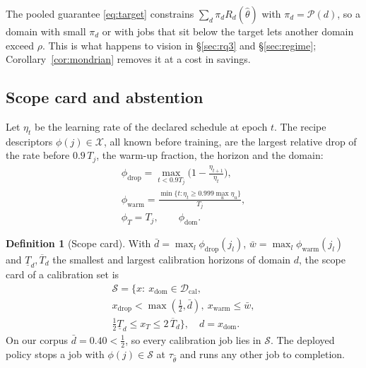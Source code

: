 \documentclass[3p,twocolumn,10pt]{elsarticle}
\theoremstyle{definition}
\newtheorem{definition}{Definition}
\begin{document}
\noindent The pooled guarantee \eqref{eq:target} constrains $\sum_d\pi_dR_d(\hat\theta)$ with $\pi_d=\mathcal{P}(d)$, so a domain with small $\pi_d$ or with jobs that sit below the target lets another domain exceed $\rho$. This is what happens to vision in \S\ref{sec:rq3} and \S\ref{sec:regime}; Corollary~\ref{cor:mondrian} removes it at a cost in savings.

\subsection{Scope card and abstention}
Let $\eta_t$ be the learning rate of the declared schedule at epoch $t$. The recipe descriptors $\phi(j)\in\mathcal{X}$, all known before training, are the largest relative drop of the rate before $0.9\,T_j$, the warm-up fraction, the horizon and the domain:
\begin{equation}
\begin{gathered}
\phi_{\mathrm{drop}}=\max_{t<0.9T_j}\Big(1-\frac{\eta_{t+1}}{\eta_t}\Big),\\
\phi_{\mathrm{warm}}=\frac{\min\{t:\eta_t\ge0.999\max_u\eta_u\}}{T_j},\\
\phi_T=T_j,\qquad \phi_{\mathrm{dom}}.
\end{gathered}
\label{eq:desc}
\end{equation}

\begin{definition}[Scope card]
\label{def:scope}
With $\bar d=\max_l\phi_{\mathrm{drop}}(j_l)$, $\bar w=\max_l\phi_{\mathrm{warm}}(j_l)$ and $\underline T_d,\overline T_d$ the smallest and largest calibration horizons of domain $d$, the scope card of a calibration set is
\[
\begin{gathered}
\mathcal{S}=\Big\{x:\ x_{\mathrm{dom}}\in\mathcal{D}_{\mathrm{cal}},\\
x_{\mathrm{drop}}<\max(\tfrac12,\bar d),\ x_{\mathrm{warm}}\le\bar w,\\
\tfrac12\underline T_{d}\le x_T\le2\,\overline T_{d}\Big\},\quad d=x_{\mathrm{dom}}.
\end{gathered}
\]
On our corpus $\bar d=0.40<\tfrac12$, so every calibration job lies in $\mathcal{S}$. The deployed policy stops a job with $\phi(j)\in\mathcal{S}$ at $\tau_{\hat\theta}$ and runs any other job to completion.
\end{definition}
\end{document}
